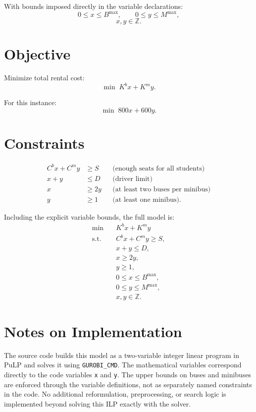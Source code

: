 With bounds imposed directly in the variable declarations:
\[
0 \le x \le B^{\max}, \qquad 0 \le y \le M^{\max},
\]
\[
x,y \in \mathbb{Z}.
\]

\section*{Objective}

Minimize total rental cost:
\[
\min \; K^b x + K^m y.
\]

For this instance:
\[
\min \; 800x + 600y.
\]

\section*{Constraints}

\begin{align}
C^b x + C^m y &\ge S
&&\text{(enough seats for all students)} \\
x + y &\le D
&&\text{(driver limit)} \\
x &\ge 2y
&&\text{(at least two buses per minibus)} \\
y &\ge 1
&&\text{(at least one minibus)}.
\end{align}

Including the explicit variable bounds, the full model is:
\begin{align}
\min \quad & K^b x + K^m y \\
\text{s.t.}\quad
& C^b x + C^m y \ge S, \\
& x + y \le D, \\
& x \ge 2y, \\
& y \ge 1, \\
& 0 \le x \le B^{\max}, \\
& 0 \le y \le M^{\max}, \\
& x,y \in \mathbb{Z}.
\end{align}

\section*{Notes on Implementation}

The source code builds this model as a two-variable integer linear program in PuLP and solves it using \texttt{GUROBI\_CMD}. The mathematical variables correspond directly to the code variables \texttt{x} and \texttt{y}. The upper bounds on buses and minibuses are enforced through the variable definitions, not as separately named constraints in the code. No additional reformulation, preprocessing, or search logic is implemented beyond solving this ILP exactly with the solver.

